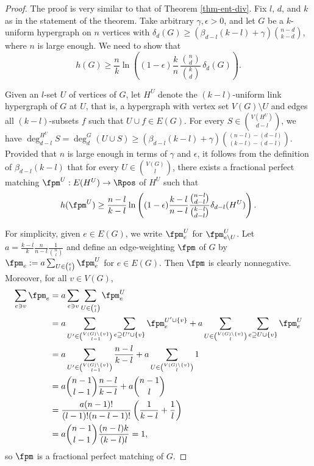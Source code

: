 \documentclass[11pt]{article}
\begin{document}
\begin{proof}
    The proof is very similar to that of Theorem \ref{thm-ent-div}. Fix $l$, $d$, and $k$ as in the statement of the theorem. Take arbitrary $\gamma,\epsilon>0$, and let $G$ be a $k$-uniform hypergraph on $n$ vertices with $\delta_d(G)\ge(\beta_{d-l}(k-l)+\gamma)\binom{n-d}{k-d}$, where $n$ is large enough. We need to show that
    $$h(G)\ge \frac{n}{k}\ln\left((1-\epsilon)\frac{k}{n}\,\frac{\binom{n}{d}}{\binom{k}{d}}\,\delta_d(G)\right).$$

    Given an $l$-set $U$ of vertices of $G$, let $H^U$ denote the $(k-l)$-uniform link hypergraph of $G$ at $U$, that is, a hypergraph with vertex set $V(G)\setminus U$ and edges all $(k-l)$-subsets $f$ such that $U\cup f\in E(G)$. For every $S\in\binom{V(H^U)}{d-l}$, we have $\deg_{d-l}^{H^U} S=\deg_d^G(U\cup S)\ge (\beta_{d-l}(k-l)+\gamma)\binom{(n-l)-(d-l)}{(k-l)-(d-l)}$. Provided that $n$ is large enough in terms of $\gamma$ and $\epsilon$, it follows from the definition of $\beta_{d-l}(k-l)$ that for every $U\in\binom{V(G)}{l}$, there exists a fractional perfect matching $\fpm^U:E(H^U)\to\Rpos$ of $H^U$ such that
    \begin{equation}\label{eq-ent-sub}
        h(\fpm^U)\ge \frac{n-l }{k-l }\ln\left((1-\epsilon)\frac{k-l }{n-l }\frac{\binom{n-l}{d-l}}{\binom{k-l}{d-l}}\delta_{d-l}(H^U)\right).
    \end{equation}

    For simplicity, given $e\in E(G)$, we write $\fpm^U_e$ for $\fpm^U_{e\setminus U}$. Let $a=\frac{k-l}{k}\frac{n }{n-l }\frac{1 }{\binom{n}{l}}$ and define an edge-weighting $\fpm$ of $G$ by $\fpm_e:=a\sum_{U\in\binom{e}{l}} \fpm^U_e$ for $e\in E(G)$. Then $\fpm$ is clearly nonnegative. Moreover, for all $v\in V(G)$,
    \begin{align*}
        \sum_{e\ni v}\fpm_e &= a\sum_{e\ni v}\sum_{U\in\binom{e}{l}}\fpm^U_e \\
        &= a\sum_{U'\in\binom{V(G)\setminus\{v\}}{l-1}}\sum_{e\supseteq U'\cup\{v\}}\fpm^{U'\cup\{v\}}_e + a\sum_{U\in \binom{V(G)\setminus\{v\}}{l}}\sum_{e\supseteq U\cup\{v\}}\fpm^U_e \\
        &= a\sum_{U'\in\binom{V(G)\setminus\{v\}}{l-1}}\frac{n-l}{k-l} + a\sum_{U\in\binom{V(G)\setminus\{v\}}{l}}1 \\
        &= a\binom{n-1}{l-1}\frac{n-l }{k-l }+a\binom{n-1}{l} \\
        &= \frac{a(n-1)!}{(l-1)!(n-l-1)!}\left(\frac{1}{k-l }+\frac{1}{l }\right) \\
        &= a\binom{n-1}{l-1}\frac{(n-l)k }{(k-l)l }=1,
    \end{align*}
    so $\fpm$ is a fractional perfect matching of $G$.


\end{proof}
\end{document}
